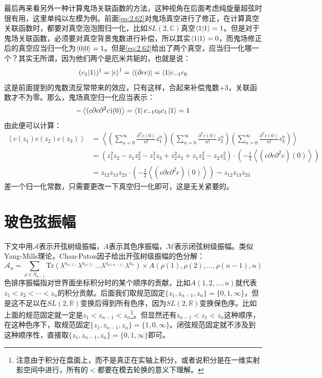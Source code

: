 最后再来看另外一种计算鬼场关联函数的方法，这种视角在后面考虑纯旋量超弦时很有用，这里单纯以左模为例。前面\ref{eq:2.62}对鬼场真空进行了修正，在计算真空关联函数时，都要对真空泡泡图归一化，比如$SL(2,\mathbb{C})$真空$\braket{1}=1$。但是对于鬼场关联函数，必须要对真空背景鬼数进行补偿，所以其实$\braket{1}=0$，而鬼场修正后的真空应当归一化为$\braket{0}=1$。但是\ref{eq:2.62}给出了两个真空，应当归一化哪一个？其实无所谓，因为他们两个是厄米共轭的，也就是说：
\begin{equation}
	(c_1|1\rangle)^\dagger=\ket{c}^\dagger = \bra{(\partial c c)}=\langle1|c_{-1}c_0
\end{equation}
这是前面提到的鬼数流反常带来的效应，只有这样，合起来补偿鬼数$+3$，关联函数才不为零。那么，鬼场真空归一化应当表示：
\begin{equation}
	-\left\langle (c\partial c\partial^2c)(0)\right\rangle = \bra{1}c_{-1}c_0c_1\ket{1}=1
\end{equation}
由此便可以计算：
\begin{equation}
\begin{aligned}
		\left\langle c(z_1)c(z_2)c(z_3)\right\rangle &= \left\langle \left(\sum_{n=0}^\infty \frac{\partial^nc(0)}{n!}z_1^n\right) \left(\sum_{n=0}^\infty \frac{\partial^nc(0)}{n!}z_2^n\right)\left(\sum_{n=0}^\infty \frac{\partial^nc(0)}{n!}z_3^n\right)\right\rangle\\
		&=\left(z_1^2 z_2 - z_1 z_2^2 - z_1^2 z_3 + z_2^2 z_3 + z_1 z_3^2 - z_2 z_3^2\right)\cdot \left(-\frac12\left\langle (c\partial c\partial^2c)(0)\right\rangle\right)\\
	&= z_{12}z_{13}z_{23}\cdot\left(-\frac12\left\langle (c\partial c\partial^2c)(0)\right\rangle\right)\sim z_{12}z_{13}z_{23}
\end{aligned}
\end{equation}
差一个归一化常数，只需要更改一下真空归一化即可，这是无关紧要的。
\section{玻色弦振幅}
\label{sec:4.3}
下文中用$\mathcal{A}$表示开弦树级振幅，$A$表示其色序振幅，$\mathcal{M}$表示闭弦树级振幅。类似Yang-Mills理论，Chan-Paton因子给出开弦树级振幅的色分解：
\begin{equation}
	\mathcal{A}_n=\sum_{\rho\in S_{n-1}}\mathrm{Tr}(\lambda^{a_{\rho(1)}}\lambda^{a_{\rho(2)}}\ldots \lambda^{a_{\rho(n-1)}}\lambda^{a_{n}})\times A(\rho(1),\rho(2),\ldots,\rho(n-1),n)
\end{equation}
色排序振幅指对世界面坐标积分时的某个顺序的贡献，比如$A(1,2,\ldots,n)$就代表$z_1<z_2<\cdots<z_n$的积分贡献。后面我们取规范固定$\{z_1,z_{n-1},z_n\}=\{0,1,\infty\}$，但是这不足以在$SL(2,\mathbb{R})$变换后得到所有色序，因为$SL(2,\mathbb{R})$变换保色序。比如上面的规范固定就一定是$z_1<z_{n-1}<z_n$\footnote{注意由于积分在盘面上，而不是真正在实轴上积分，或者说积分是在一维实射影空间中进行，所有的$<$都要在模去轮换的意义下理解。}。但显然还有$z_{n-1}<z_1<z_n$这种顺序，在这种色序下，取规范固定$\{z_1,z_{n-1},z_n\}=\{1,0,\infty\}$。闭弦规范固定就不涉及到这种顺序性，直接取$\{z_1,z_{n-1},z_n\}=\{0,1,\infty\}$即可。
